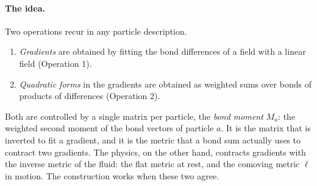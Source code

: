\documentclass[11pt,aps,preprint,nofootinbib,superscriptaddress,tightenlines]{revtex4-2}
\let\oldparagraph\paragraph
\renewcommand{\paragraph}{\par\medskip\oldparagraph}
\begin{document}
\paragraph{The idea.}  Two operations recur in any particle description.
\begin{enumerate}
\item \emph{Gradients} are obtained by fitting the bond differences of a field
  with a linear field (Operation 1).
\item \emph{Quadratic forms} in the gradients are obtained as weighted sums over
  bonds of products of differences (Operation 2).
\end{enumerate}
Both are controlled by a single matrix per particle, the \emph{bond moment}
$M_a$: the weighted second moment of the bond vectors of particle $a$.  It is
the matrix that is inverted to fit a gradient, and it is the metric that a bond
sum actually uses to contract two gradients.  The physics, on the other hand,
contracts gradients with the inverse metric of the fluid: the flat metric at
rest, and the comoving metric $\ell$ in motion.  The construction works when
these two agree.
\end{document}
